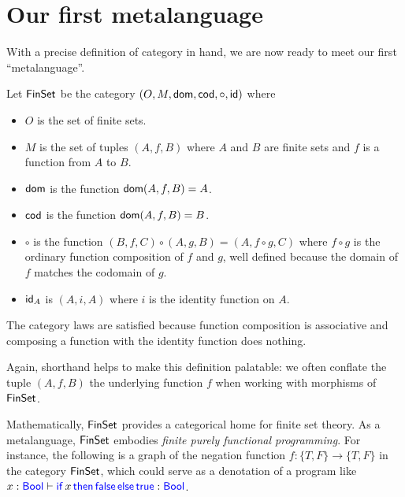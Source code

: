 \section{Our first metalanguage}

With a precise definition of category in hand, we are now ready to meet our first
``metalanguage''.

\begin{definition} \label{def:finset}
  \sloppy
  Let \(\mathsf{FinSet}\) be the category \((O,M,\operatorname{\mathsf{dom}},\operatorname{\mathsf{cod}},\circ,\mathsf{id})\)
  where \begin{itemize}[noitemsep]
  \item \(O\) is the set of finite
    sets.
  \item \(M\) is the set of tuples \((A,f,B)\) where \(A\) and \(B\)
    are finite sets
    and \(f\) is a function from \(A\) to \(B\).
  \item \(\operatorname{\mathsf{dom}}\) is the function \(\operatorname{\mathsf{dom}}(A,f,B) = A\).
  \item \(\operatorname{\mathsf{cod}}\) is the function \(\operatorname{\mathsf{dom}}(A,f,B) = B\).
  \item \(\circ\) is the function \((B,f,C)\circ(A,g,B) = (A,f\circ g,C)\)
    where \(f\circ g\) is the ordinary function composition of \(f\) and \(g\),
    well defined because the domain of \(f\) matches the codomain of \(g\).
  \item \(\mathsf{id}_A\) is \((A,i,A)\) where \(i\) is the identity function on \(A\).
  \end{itemize}
The category laws are satisfied because function composition is associative
  and composing a function with the identity function does nothing.
\end{definition}
Again, shorthand helps to make this definition palatable:
we often conflate the tuple \((A,f,B)\) the underlying function \(f\)
when working with morphisms of \(\mathsf{FinSet}\).

Mathematically, \(\mathsf{FinSet}\) provides a categorical home for finite set theory.
As a metalanguage, \(\mathsf{FinSet}\) embodies \emph{finite purely functional programming}.
For instance,
the following is a graph of the negation function \(f : \{T,F\} \to \{T,F\}\)
in the category \(\mathsf{FinSet}\), which could serve as a denotation
of a program like \(x:\mathsf{{\color{blue}Bool}} \vdash \mathsf{{\color{blue}if}}{}\,x\,\mathsf{{\color{blue}then}}{}\,\mathsf{{\color{blue}false}}\,\mathsf{{\color{blue}else}}{}\,\mathsf{{\color{blue}true}} : \mathsf{{\color{blue}Bool}}\).

